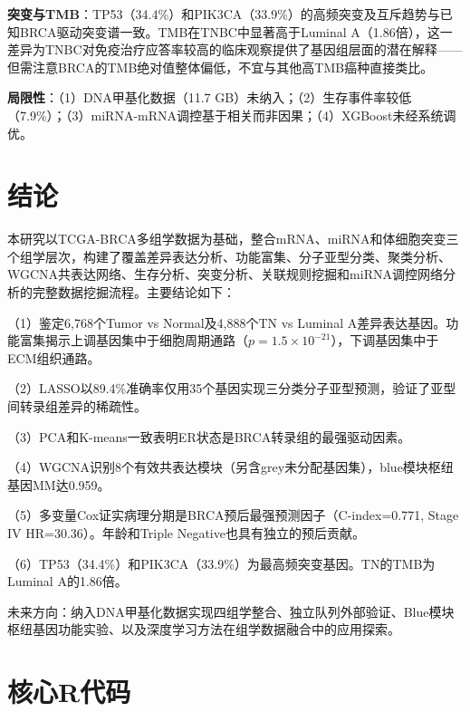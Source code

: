 \documentclass[12pt,a4paper,openany]{ctexbook}
\begin{document}
\textbf{突变与TMB}：TP53（34.4\%）和PIK3CA（33.9\%）的高频突变及互斥趋势与已知BRCA驱动突变谱一致。TMB在TNBC中显著高于Luminal A（1.86倍），这一差异为TNBC对免疫治疗应答率较高的临床观察提供了基因组层面的潜在解释——但需注意BRCA的TMB绝对值整体偏低，不宜与其他高TMB癌种直接类比。

\textbf{局限性}：（1）DNA甲基化数据（11.7 GB）未纳入；（2）生存事件率较低（7.9\%）；（3）miRNA-mRNA调控基于相关而非因果；（4）XGBoost未经系统调优。

\chapter{结论}
本研究以TCGA-BRCA多组学数据为基础，整合mRNA、miRNA和体细胞突变三个组学层次，构建了覆盖差异表达分析、功能富集、分子亚型分类、聚类分析、WGCNA共表达网络、生存分析、突变分析、关联规则挖掘和miRNA调控网络分析的完整数据挖掘流程。主要结论如下：

（1）鉴定6,768个Tumor vs Normal及4,888个TN vs Luminal A差异表达基因。功能富集揭示上调基因集中于细胞周期通路（$p=1.5\times10^{-21}$），下调基因集中于ECM组织通路。

（2）LASSO以89.4\%准确率仅用35个基因实现三分类分子亚型预测，验证了亚型间转录组差异的稀疏性。

（3）PCA和K-means一致表明ER状态是BRCA转录组的最强驱动因素。

（4）WGCNA识别8个有效共表达模块（另含grey未分配基因集），blue模块枢纽基因MM达0.959。

（5）多变量Cox证实病理分期是BRCA预后最强预测因子（C-index=0.771, Stage IV HR=30.36）。年龄和Triple Negative也具有独立的预后贡献。

（6）TP53（34.4\%）和PIK3CA（33.9\%）为最高频突变基因。TN的TMB为Luminal A的1.86倍。

未来方向：纳入DNA甲基化数据实现四组学整合、独立队列外部验证、Blue模块枢纽基因功能实验、以及深度学习方法在组学数据融合中的应用探索。

\printbibliography

\newpage
\appendix
\chapter{核心R代码}
\end{document}
